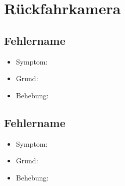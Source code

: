 \documentclass[qualitaetssicherung.tex]{subfiles}
\begin{document}
\section{Rückfahrkamera}

	\subsection{Fehlername}
		\begin{itemize}
			\item
			Symptom:
			\item
			Grund:
			\item
			Behebung:
		\end{itemize}
		
	\subsection{Fehlername}
		\begin{itemize}
			\item
			Symptom:
			\item
			Grund:
			\item
			Behebung:
		\end{itemize}
		
\end{document}
